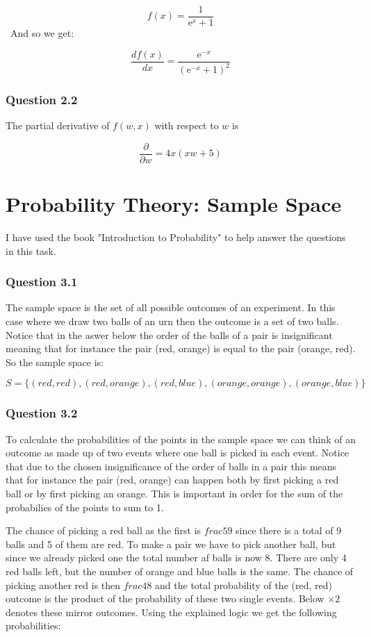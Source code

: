 \documentclass{article}
\begin{document}
\[
f(x) = \dfrac{1}{\mathrm{e}^x + 1}
\]
\
And so we get:

\[
\dfrac{df(x)}{dx} = \dfrac{\mathrm{e}^{-x}}{\left(\mathrm{e}^{-x}+1\right)^2}
\]

\subsubsection*{Question 2.2}

The partial derivative of \(f(w,x)\) with respect to \(w\) is

\[
\dfrac{\partial}{\partial w} = 4x(xw+5)
\]

\section{Probability Theory: Sample Space}
I have used the book "Introduction to Probability" \cite{prob} to help answer
the questions in this task.

\subsubsection*{Question 3.1}
The sample space is the set of all possible outcomes of an experiment. In this
case where we draw two balls of an urn then the outcome is a set of two
balls. Notice that in the aswer below the order of the balls of a pair is
insignificant meaning that for instance the pair (red, orange) is equal to the
pair (orange, red). So the sample space is:

\[
S = \{(red, red), (red, orange), (red, blue), (orange, orange), (orange, blue)\}
\]

\newpage
\subsubsection*{Question 3.2}
To calculate the probabilities of the points in the sample space we can think of
an outcome as made up of two events where one ball is picked in each
event. Notice that due to the chosen insignificance of the order of balls in a
pair this means that for instance the pair (red, orange) can happen both by
first picking a red ball or by first picking an orange. This is important in
order for the sum of the probabilies of the points to sum to 1.

The chance of picking a red ball as the first is \(frac{5}{9}\) since there is a
total of 9 balls and 5 of them are red. To make a pair we have to pick another
ball, but since we already picked one the total number af balls is now 8. There
are only 4 red balls left, but the number of orange and blue balls is the
same. The chance of picking another red is then \(frac{4}{8}\) and the total
probability of the (red, red) outcome is the product of the probability of these
two single events. Below \(\times 2\) denotes these mirror outcomes. Using the
explained logic we get the following probabilities:
\end{document}
